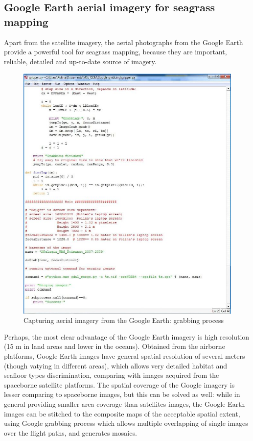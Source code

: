 \documentclass[10pt, a4paper]{article}
\begin{document}
\subsection{Google Earth aerial imagery for seagrass mapping}
Apart from the satellite imagery, the aerial photographs from the Google Earth provide
a powerful tool for seagrass mapping, because they are important, reliable, detailed
and up-to-date source of imagery.
\begin{figure}
\centering
\includegraphics[scale=0.27]{Fig-22.jpg}
\caption{Capturing aerial imagery from the Google Earth: grabbing process}
\label{fig:22}
\end{figure}

Perhaps, the most clear advantage of the Google
Earth imagery is high resolution (15 m in land areas and lower in the oceans).
Obtained from the airborne platforms, Google Earth images have general spatial
resolution of several meters (though vatying in different areas), which allows very
detailed habitat and seafloor types discrimination, comparing with images
acquired from the spaceborne satellite platforms.
The spatial coverage of the Google imagery is lesser comparing to spaceborne images, but this can be solved as
well: while in general providing smaller area coverage than satellites images, the Google Earth
images can be stitched to the composite maps of the acceptable spatial extent, using Google grabbing
process which allows multiple overlapping of single images over the flight paths, and generates
mosaics.
\end{document}

